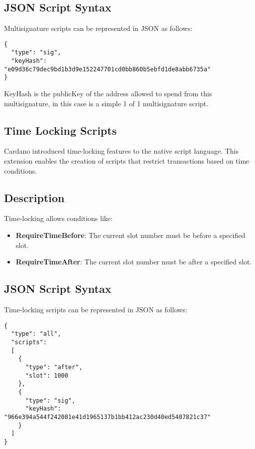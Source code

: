 \subsection{JSON Script Syntax}

Multisignature scripts can be represented in JSON as follows:

\begin{lstlisting}
{
  "type": "sig",
  "keyHash": "e09d36c79dec9bd1b3d9e152247701cd0bb860b5ebfd1de8abb6735a"
}
\end{lstlisting}

KeyHash is the publicKey of the address allowed to spend from this multisignature, in this case is a simple 1 of 1 multisignature script.

\subsection{Time Locking Scripts}

Cardano introduced time-locking features to the native script language. This extension enables the creation of scripts that restrict transactions based on time conditions.

\subsection{Description}

Time-locking allows conditions like:

\begin{itemize}
    \item \textbf{RequireTimeBefore}: The current slot number must be before a specified slot.
    \item \textbf{RequireTimeAfter}: The current slot number must be after a specified slot.
\end{itemize}

\subsection{JSON Script Syntax}

Time-locking scripts can be represented in JSON as follows:

\begin{lstlisting}
{
  "type": "all",
  "scripts":
  [
    {
      "type": "after",
      "slot": 1000
    },
    {
      "type": "sig",
      "keyHash": "966e394a544f242081e41d1965137b1bb412ac230d40ed5407821c37"
    }
  ]
}
\end{lstlisting}

